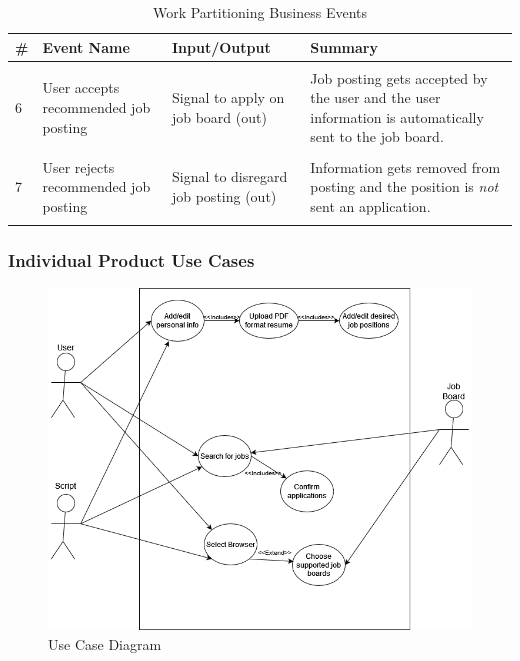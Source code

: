 \documentclass[12pt, titlepage]{article}
\begin{document}
\begin{table}[ht]
\centering
    \begin{tabular}{|P{0.2in}|P{1.1in}|P{1.8in}|P{2.2in}|}
    \hline
    \textbf{\#} & \textbf{Event Name} & \textbf{Input/Output} & \textbf{Summary}\\ 
    
    \hline
    
    & & & \\
    
    6
    & User accepts recommended job posting 
    & Signal to apply on job board (out)
    & Job posting gets accepted by the user and the user information is automatically sent to the job board. \\
    
    & & & \\
    
    7
    & User rejects recommended job posting 
    &  Signal to disregard job posting (out)
    & Information gets removed from posting and the position is \textit{not} sent an application. \\
    
    & & & \\
    
    \hline
    \end{tabular}
    \caption{Work Partitioning Business Events}
\end{table}

\FloatBarrier

\subsubsection{Individual Product Use Cases}

\begin{figure}[ht]
    \centering
    \includegraphics[width=125mm,scale=0.5]{SRS_Diagrams/3XA3useCase0.drawio.png}
    \caption{Use Case Diagram}
    \label{fig:usecase}
\end{figure}
\end{document}
